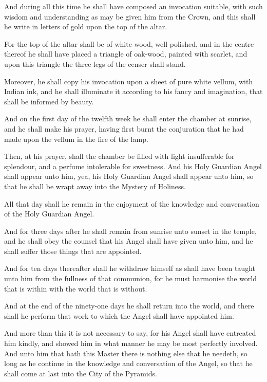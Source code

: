 And during all this time he shall have composed an invocation suitable, with such wisdom and understanding as may be given him from the Crown, and this shall he write in letters of gold upon the top of the altar.

For the top of the altar shall be of white wood, well polished, and in the centre thereof he shall have placed a triangle of oak-wood, painted with scarlet, and upon this triangle the three legs of the censer shall stand.

Moreover, he shall copy his invocation upon a sheet of pure white vellum, with Indian ink, and he shall illuminate it according to his fancy and imagination, that shall be informed by beauty.

And on the first day of the twelfth week he shall enter the chamber at sunrise, and he shall make his prayer, having first burnt the conjuration that he had made upon the vellum in the fire of the lamp.

Then, at his prayer, shall the chamber be filled with light insufferable for splendour, and a perfume intolerable for sweetness. And his Holy Guardian Angel shall appear unto him, yea, his Holy Guardian Angel shall appear unto him, so that he shall be wrapt away into the Mystery of Holiness.

All that day shall he remain in the enjoyment of the knowledge and conversation of the Holy Guardian Angel.

And for three days after he shall remain from sunrise unto sunset in the temple, and he shall obey the counsel that his Angel shall have given unto him, and he shall suffer those things that are appointed.

And for ten days thereafter shall he withdraw himself as shall have been taught unto him from the fullness of that communion, for he must harmonise the world that is within with the world that is without.

And at the end of the ninety-one days he shall return into the world, and there shall he perform that work to which the Angel shall have appointed him.

And more than this it is not necessary to say, for his Angel shall have entreated him kindly, and showed him in what manner he may be most perfectly involved. And unto him that hath this Master there is nothing else that he needeth, so long as he continue in the knowledge and conversation of the Angel, so that he shall come at last into the City of the Pyramids.


